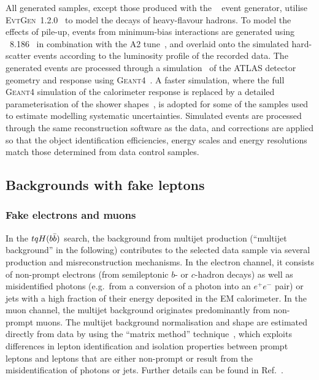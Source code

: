 All generated samples, except those produced with the {\sherpa}~\cite{Gleisberg:2008ta} event generator, 
utilise \textsc{EvtGen}~1.2.0~\cite{Lange:2001uf} to model the decays of heavy-flavour hadrons. 
To model the effects of pile-up, events from minimum-bias interactions are generated using {\pythia}~8.186~\cite{Sjostrand:2007gs}  
in combination with the A2 tune~\cite{ATL-PHYS-PUB-2011-014}, 
and overlaid onto the simulated hard-scatter events according to the luminosity profile of the recorded data. 
The generated events are processed through a simulation~\cite{Aad:2010ah} of the ATLAS detector geometry and response 
using \textsc{Geant4}~\cite{Agostinelli:2002hh}. A faster simulation, where the full \textsc{Geant4} simulation of
the calorimeter response is replaced by a detailed parameterisation of the shower shapes~\cite{FastCaloSim},
is adopted for some of the samples used to estimate modelling systematic uncertainties.
Simulated events are processed through the same reconstruction software as the data, and corrections are applied so that the object identification 
efficiencies, energy scales and energy resolutions match those determined from data control samples.

\subsection{Backgrounds with fake leptons}
\label{sec:fakeleptons}

\subsubsection{Fake electrons and muons}
In the $tqH(b\bar{b})$ search, the background from multijet production (``multijet background'' in the following) contributes to the selected 
data sample via several production and misreconstruction mechanisms.  
In the electron channel, it consists of non-prompt electrons (from semileptonic $b$- or $c$-hadron decays) as well as 
misidentified photons (e.g.~from a conversion of a photon into an $e^+e^-$ pair) or jets with a high fraction of 
their energy deposited in the EM calorimeter.  In the muon channel, the multijet background originates predominantly from 
non-prompt muons.  The multijet background normalisation and shape are estimated directly from data by using the ``matrix method''
technique~\cite{Aad:2010ey,ATLAS-CONF-2014-058}, which exploits differences in lepton identification and isolation properties between 
prompt leptons and leptons that are either non-prompt or result from the misidentification of photons or jets. 
Further details can be found in Ref.~\cite{Aaboud:2018mjh}.

